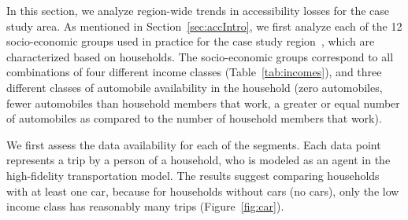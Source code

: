 In this section, we analyze region-wide trends in accessibility losses for the case study area. As mentioned in Section~\ref{sec:accIntro}, we first analyze each of the 12 socio-economic groups used in practice for the case study region~\cite{ory_personal_2013}, which are characterized based on households. The socio-economic groups correspond to all combinations of four different income classes (Table~\ref{tab:incomes}),
and three different classes of automobile availability in the household (zero automobiles, fewer automobiles than household members that work, a greater or equal number of automobiles as compared to the number of household members that work).



We first assess the data availability for each of the segments. Each data point represents a trip by a person of a household, who is  modeled as an agent in the high-fidelity transportation model. The results suggest comparing households with at least one car, because for households without cars (no cars), only the low income class has reasonably many trips (Figure~\ref{fig:car}). 




